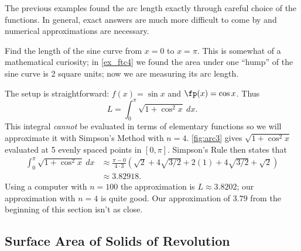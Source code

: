 The previous examples found the arc length exactly through careful choice of the functions. In general, exact answers are much more difficult to come by and numerical approximations are necessary.

\begin{example}\label{ex_arc3}
Find the length of the sine curve from $x=0$ to $x=\pi$.
\solution
This is somewhat of a mathematical curiosity; in \autoref{ex_ftc4} we found the area under one ``hump'' of the sine curve is 2 square units; now we are measuring its arc length.

The setup is straightforward: $f(x) = \sin x$ and $\fp(x) = \cos x$. Thus 
\[L = \int_0^\pi \sqrt{1+\cos^2x}\ dx.\]
This integral \textit{cannot} be evaluated in terms of elementary functions so we will approximate it with Simpson's Method with $n=4$. \autoref{fig:arc3} gives $\sqrt{1+\cos^2x}$ evaluated at 5 evenly spaced points in $[0,\pi]$. Simpson's Rule then states that 
\begin{align*}
	\int_0^\pi \sqrt{1+\cos^2x}\ dx
	&\approx	\frac{\pi-0}{4\cdot 3}
	\left(\sqrt{2}+4\sqrt{3/2}+2(1)+4\sqrt{3/2}+\sqrt{2}\right) \\
	&\approx3.82918.
\end{align*}
Using a computer with $n=100$ the approximation is $L\approx 3.8202$; our approximation with $n=4$ is quite good.  Our approximation of $3.79$ from the beginning of this section isn't as close.
\end{example}

\subsection{Surface Area of Solids of Revolution}


